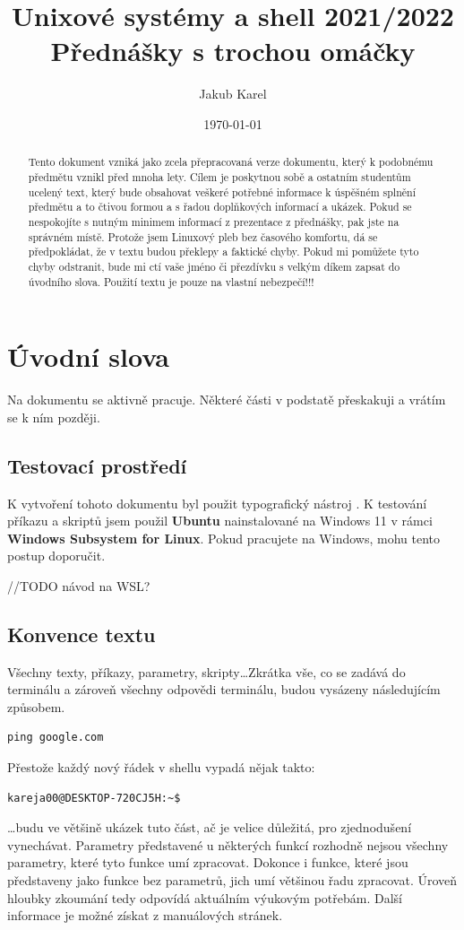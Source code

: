 \documentclass{article}
\title{\Huge{Unixové systémy a shell 2021/2022}\\
\vspace{1em}
\normalsize{Přednášky s trochou omáčky}}
\author{\normalsize Jakub Karel}
\date{\today}
\begin{document}
\maketitle
\begin{abstract}
Tento dokument vzniká jako zcela přepracovaná verze dokumentu, který k podobnému předmětu vznikl před mnoha lety. Cílem je poskytnou sobě a ostatním studentům ucelený text, který bude obsahovat veškeré potřebné informace k úspěšném splnění předmětu a to čtivou formou a s řadou doplňkových informací a ukázek. Pokud se nespokojíte s nutným minimem informací z prezentace z přednášky, pak jste na správném místě. Protože jsem Linuxový pleb bez časového komfortu, dá se předpokládat, že v textu budou překlepy a faktické chyby. Pokud mi pomůžete tyto chyby odstranit, bude mi ctí vaše jméno či přezdívku s velkým díkem zapsat do úvodního slova. Použití textu je pouze na vlastní nebezpečí!!!
\end{abstract}

\thispagestyle{empty}
\newpage
\thispagestyle{empty}
\tableofcontents
\thispagestyle{empty}
\newpage
\setcounter{page}{1}

\section{Úvodní slova}
Na dokumentu se aktivně pracuje. Některé části v podstatě přeskakuji a vrátím se k ním později.

\subsection{Testovací prostředí}
K vytvoření tohoto dokumentu byl použit typografický nástroj \LaTeXe. K testování příkazu a skriptů jsem použil \textbf{Ubuntu} nainstalované na Windows 11 v rámci \textbf{Windows Subsystem for Linux}. Pokud pracujete na Windows, mohu tento postup doporučit.

//TODO návod na WSL?

\subsection{Konvence textu}
Všechny texty, příkazy, parametry, skripty\dots Zkrátka vše, co se zadává do terminálu a zároveň všechny odpovědi terminálu, budou vysázeny následujícím způsobem.
\begin{verbatim}
ping google.com
\end{verbatim}
Přestože každý nový řádek v shellu vypadá nějak takto:
\begin{verbatim}
kareja00@DESKTOP-720CJ5H:~$
\end{verbatim}
\dots budu ve většině ukázek tuto část, ač je velice důležitá, pro zjednodušení vynechávat. Parametry představené u některých funkcí rozhodně nejsou všechny parametry, které tyto funkce umí zpracovat. Dokonce i funkce, které jsou představeny jako funkce bez parametrů, jich umí většinou řadu zpracovat. Úroveň hloubky zkoumání tedy odpovídá aktuálním výukovým potřebám. Další informace je možné získat z manuálových stránek.
\end{document}
